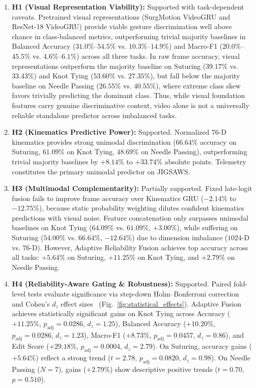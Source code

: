 \documentclass[10pt,journal]{IEEEtran}
\begin{document}
\begin{enumerate}
    \item \textbf{H1 (Visual Representation Viability):} Supported with task-dependent caveats. Pretrained visual representations (SurgMotion VideoGRU and ResNet-18 VideoGRU) provide viable gesture discrimination well above chance in class-balanced metrics, outperforming trivial majority baselines in Balanced Accuracy ($31.0\%$--$54.5\%$ vs. $10.3\%$--$14.9\%$) and Macro-F1 ($20.0\%$--$45.5\%$ vs. $4.6\%$--$6.1\%$) across all three tasks. In raw frame accuracy, visual representations outperform the majority baseline on Suturing ($39.17\%$ vs. $33.43\%$) and Knot Tying ($53.60\%$ vs. $27.35\%$), but fall below the majority baseline on Needle Passing ($26.55\%$ vs. $40.55\%$), where extreme class skew favors trivially predicting the dominant class. Thus, while visual foundation features carry genuine discriminative context, video alone is not a universally reliable standalone predictor across imbalanced tasks.
    \item \textbf{H2 (Kinematics Predictive Power):} Supported. Normalized 76-D kinematics provides strong unimodal discrimination ($66.64\%$ accuracy on Suturing, $61.09\%$ on Knot Tying, $48.69\%$ on Needle Passing), outperforming trivial majority baselines by $+8.14\%$ to $+33.74\%$ absolute points. Telemetry constitutes the primary unimodal predictor on JIGSAWS.
    \item \textbf{H3 (Multimodal Complementarity):} Partially supported. Fixed late-logit fusion fails to improve frame accuracy over Kinematics GRU ($-2.14\%$ to $-12.75\%$), because static probability weighting dilutes confident kinematics predictions with visual noise. Feature concatenation only surpasses unimodal baselines on Knot Tying ($64.09\%$ vs. $61.09\%$, $+3.00\%$), while suffering on Suturing ($54.00\%$ vs. $66.64\%$, $-12.64\%$) due to dimension imbalance ($1024$-D vs. $76$-D). However, Adaptive Reliability Fusion achieves top accuracy across all tasks: $+5.64\%$ on Suturing, $+11.25\%$ on Knot Tying, and $+2.79\%$ on Needle Passing.
    \item \textbf{H4 (Reliability-Aware Gating \& Robustness):} Supported. Paired fold-level tests evaluate significance via step-down Holm--Bonferroni correction~\cite{holm1979simple} and Cohen's $d_z$ effect sizes~\cite{cohen1988statistical} (Fig.~\ref{fig:statistical_effects}). Adaptive Fusion achieves statistically significant gains on Knot Tying across Accuracy ($+11.25\%$, $p_{\text{adj}}=0.0286$, $d_z=1.25$), Balanced Accuracy ($+10.20\%$, $p_{\text{adj}}=0.0286$, $d_z=1.23$), Macro-F1 ($+8.73\%$, $p_{\text{adj}}=0.0457$, $d_z=0.86$), and Edit Score ($+29.18\%$, $p_{\text{adj}}=0.0004$, $d_z=2.79$). On Suturing, accuracy gains ($+5.64\%$) reflect a strong trend ($t=2.78$, $p_{\text{adj}}=0.0820$, $d_z=0.98$). On Needle Passing ($N=7$), gains ($+2.79\%$) show descriptive positive trends ($t=0.70$, $p=0.510$).

\end{enumerate}
\end{document}
